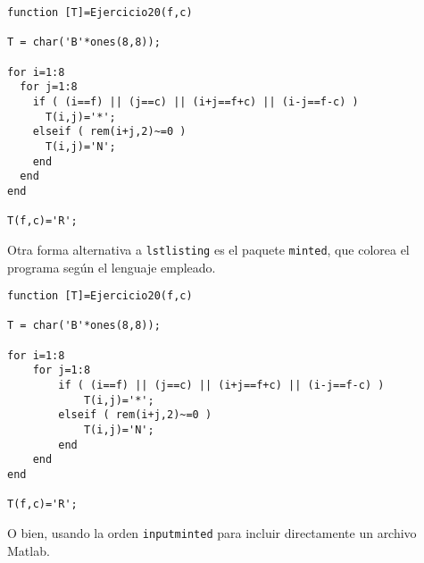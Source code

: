 \begin{verbatim}
function [T]=Ejercicio20(f,c)

T = char('B'*ones(8,8));

for i=1:8
  for j=1:8
    if ( (i==f) || (j==c) || (i+j==f+c) || (i-j==f-c) )
      T(i,j)='*';
    elseif ( rem(i+j,2)~=0 )
      T(i,j)='N';
    end
  end
end

T(f,c)='R';
\end{verbatim}

\noindent Otra forma alternativa a \texttt{lstlisting} es el paquete \texttt{minted}, que colorea el programa según el lenguaje empleado.


\begin{verbatim}
function [T]=Ejercicio20(f,c)

T = char('B'*ones(8,8));

for i=1:8
    for j=1:8
        if ( (i==f) || (j==c) || (i+j==f+c) || (i-j==f-c) )
            T(i,j)='*';
        elseif ( rem(i+j,2)~=0 )
            T(i,j)='N';
        end
    end
end

T(f,c)='R';
\end{verbatim}

\noindent O bien, usando la orden \texttt{inputminted} para incluir directamente un archivo Matlab.

\inputminted{matlab}{tex/latex/ejercicio20.m}
